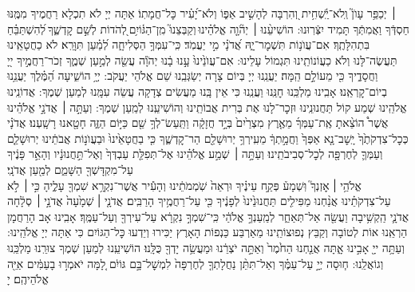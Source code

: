 \documentclass[twoside, openany, parskip=half, 11pt]{book}
\begin{document}
׀ יְכַפֵּ֥ר עָוֺן֮ וְֽלֹא־יַֽ֫שְׁחִ֥ית וְ֭הִרְבָּה לְהָשִׁ֣יב אַפּ֑וֹ וְלֹא־יָ֝עִ֗יר כׇּל־חֲמָתֽוֹ׃
אַתָּה יְיָ לֹא תִכְלָא רַחֲמֶיךָ מִמֶּֽנּוּ חַסְדְּֿךָ וַאֲמִתְּֿךָ תָּמִיד יִצְּֿרֽוּנוּ:
הוֹשִׁיעֵ֨נוּ ׀ יְהֹ֘וָ֤ה אֱלֹהֵ֗ינוּ וְקַבְּצֵנוּ֮ מִֽן־הַגּ֫וֹיִ֥ם לְ֭הֹדוֹת לְשֵׁ֣ם קׇדְשֶׁ֑ךָ לְ֝הִשְׁתַּבֵּ֗חַ בִּתְהִלָּתֶֽךָ׃ 
אִם־עֲוֺנ֥וֹת תִּשְׁמׇר־יָ֑הּ אֲ֝דֹנָ֗י מִ֣י יַעֲמֹֽד׃  כִּֽי־עִמְּךָ֥ הַסְּלִיחָ֑ה לְ֝מַ֗עַן תִּוָּרֵֽא׃  
לֹא כַחֲטָאֵֽינוּ תַּעֲשֶׂה־לָּנוּ וְלֹא כַעֲוֹנוֹתֵֽינוּ תִּגְמוֹל עָלֵינוּ:
אִם־עֲוֺנֵ֙ינוּ֙ עָ֣נוּ בָ֔נוּ יְהֹוָ֕ה עֲשֵׂ֖ה לְמַ֣עַן שְׁמֶ֑ךָ זְכֹר־רַחֲמֶ֣יךָ ייָ֭ וַחֲסָדֶ֑יךָ כִּ֖י מֵעוֹלָ֣ם הֵֽמָּה׃ 
יַעֲנֵֽנוּ יְיָ בְּיוֹם צָרָה יְשַׂגְּבֵֽנוּ שֵׁם אֱלֹהֵי יַעֲקֹב:
יְיָ֥  הוֹשִׁ֑יעָה הַ֝מֶּ֗לֶךְ יַעֲנֵ֥נוּ בְיוֹם־קׇרְאֵֽנוּ׃ 
אָבִֽינוּ מַלְכֵּֽנוּ חׇנֵּֽנוּ וַעֲנֵֽנוּ כִּי אֵין בָּֽנוּ מַעֲשִׂים צְדָקָה עֲשֵׂה עִמָּֽנוּ לְמַעַן שְׁמֶךָ:
אֲדוֹנֵֽינוּ אֱלֹהֵֽינוּ שְׁמַע קוֹל תַּחֲנוּנֵֽינוּ וּזְכׇר־לָנוּ אֶת בְּרִית אֲבוֹתֵֽינוּ וְהוֹשִׁיעֵֽנוּ לְמַֽעַן שְׁמֶךָ:
וְעַתָּ֣ה ׀ אֲדֹנָ֣י אֱלֹהֵ֗ינוּ אֲשֶׁר֩ הוֹצֵ֨אתָ אֶֽת־עַמְּךָ֜ מֵאֶ֤רֶץ מִצְרַ֙יִם֙ בְּיָ֣ד חֲזָקָ֔ה וַתַּֽעַשׂ־לְךָ֥ שֵׁ֖ם כַּיּ֣וֹם הַזֶּ֑ה חָטָ֖אנוּ רָשָֽׁעְנוּ׃ אֲדֹנָ֗י כְּכׇל־צִדְקֹתֶ֙ךָ֙ יָֽשׇׁב־נָ֤א אַפְּךָ֙ וַחֲמָ֣תְךָ֔ מֵעִֽירְךָ֥ יְרוּשָׁלַ֖‍ִם הַר־קׇדְשֶׁ֑ךָ כִּ֤י בַחֲטָאֵ֙ינוּ֙ וּבַעֲוֺנ֣וֹת אֲבֹתֵ֔ינוּ יְרוּשָׁלַ֧‍ִם וְעַמְּךָ֛ לְחֶרְפָּ֖ה לְכׇל־סְבִיבֹתֵֽינוּ׃ וְעַתָּ֣ה ׀ שְׁמַ֣ע אֱלֹהֵ֗ינוּ אֶל־תְּפִלַּ֤ת עַבְדְּךָ֙ וְאֶל־תַּ֣חֲנוּנָ֔יו וְהָאֵ֣ר פָּנֶ֔יךָ עַל־מִקְדָּשְׁךָ֖ הַשָּׁמֵ֑ם לְמַ֖עַן אֲדֹנָֽי׃\\
אֱלֹהַ֥י ׀ אׇזְנְךָ֮ וּֽשְׁמָע֒ פְּקַ֣ח עֵינֶ֗יךָ וּרְאֵה֙ שֹֽׁמְמֹתֵ֔ינוּ וְהָעִ֕יר אֲשֶׁר־נִקְרָ֥א שִׁמְךָ֖ עָלֶ֑יהָ כִּ֣י ׀ לֹ֣א עַל־צִדְקֹתֵ֗ינוּ אֲנַ֨חְנוּ מַפִּילִ֤ים תַּחֲנוּנֵ֙ינוּ֙ לְפָנֶ֔יךָ כִּ֖י עַל־רַחֲמֶ֥יךָ הָרַבִּֽים׃ אֲדֹנָ֤י ׀ שְׁמָ֙עָה֙ אֲדֹנָ֣י ׀ סְלָ֔חָה אֲדֹנָ֛י הַֽקְשִׁ֥יבָה וַעֲשֵׂ֖ה אַל־תְּאַחַ֑ר לְמַֽעַנְךָ֣ אֱלֹהַ֔י כִּֽי־שִׁמְךָ֣ נִקְרָ֔א עַל־עִירְךָ֖ וְעַל־עַמֶּֽךָ׃ 
אָבִֽינוּ אָב הָרַחֲמָן הַרְאֵֽנוּ אוֹת לְטוֹבָה וְקַבֵּץ נְפוּצוֹתֵֽינוּ מֵאַרְבַּע כַּנְפוֹת הָאָרֶץ יַכִּירוּ וְיֵדְעוּ כׇּל־הַגּוֹיִם כִּי אַתָּה יְיָ אֱלֹהֵֽינוּ: 
וְעַתָּ֥ה ייָ֖ אָבִ֣ינוּ אָ֑תָּה אֲנַ֤חְנוּ הַחֹ֙מֶר֙ וְאַתָּ֣ה יֹצְרֵ֔נוּ וּמַעֲשֵׂ֥ה יָדְךָ֖ כֻּלָּֽנוּ׃ הוֹשִׁיעֵֽנוּ לְמַעַן שְׁמֶךָ צוּרֵֽנוּ מַלְכֵּֽנוּ וְגוֹאֲלֵֽנוּ:
ח֧וּסָה יְיָ֣ עַל־עַמֶּ֗ךָ וְאַל־תִּתֵּ֨ן נַחֲלָתְךָ֤ לְחֶרְפָּה֙ לִמְשׇׁל־בָּ֣ם גּוֹיִ֔ם לָ֚מָּה יֹאמְר֣וּ בָעַמִּ֔ים אַיֵּ֖ה אֱלֹהֵיהֶֽם׃ יָ
\end{document}
